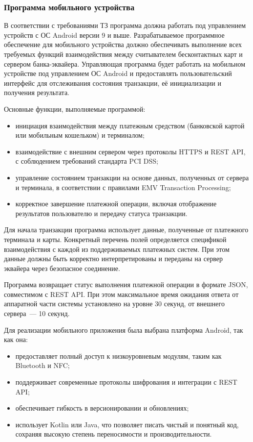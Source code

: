 \subsubsection{Программа мобильного устройства}

В соответствии с требованиями ТЗ программа должна работать под управлением устройств с ОС Android версии 9 и выше.
Разрабатываемое программное обеспечение для мобильного устройства должно обеспечивать выполнение всех требуемых функций взаимодействия между считывателем бесконтактных карт и сервером банка-эквайера.
Управляющая программа будет работать на мобильном устройстве под управлением ОС Android и предоставлять пользовательский интерфейс для отслеживания состояния транзакции, её инициализации и получения результата.

Основные функции, выполняемые программой:
\begin{itemize}
    \item инициация взаимодействия между платежным средством (банковской картой или мобильным кошельком) и терминалом;
    \item взаимодействие с внешним сервером через протоколы HTTPS и REST API, с соблюдением требований стандарта PCI DSS;
    \item управление состоянием транзакции на основе данных, полученных от сервера и терминала, в соответствии с правилами EMV Transaction Processing;
    \item корректное завершение платежной операции, включая отображение результатов пользователю и передачу статуса транзакции.
\end{itemize}

Для начала транзакции программа использует данные, полученные от платежного терминала и карты.
Конкретный перечень полей определяется спецификой взаимодействия с каждой из поддерживаемых платежных систем.
При этом данные должны быть корректно интерпретированы и переданы на сервер эквайера через безопасное соединение.

Программа возвращает статус выполнения платежной операции в формате JSON, совместимом с REST API.
При этом максимальное время ожидания ответа от аппаратной части системы установлено на уровне 30 секунд, от внешнего сервера~--- 10 секунд.


Для реализации мобильного приложения была выбрана платформа Android, так как она:
\begin{itemize}
    \item предоставляет полный доступ к низкоуровневым модулям, таким как Bluetooth и NFC;
    \item поддерживает современные протоколы шифрования и интеграции с REST API;
    \item обеспечивает гибкость в версионировании и обновлениях;
    \item использует Kotlin или Java, что позволяет писать чистый и понятный код, сохраняя высокую степень переносимости и производительности.
\end{itemize}

